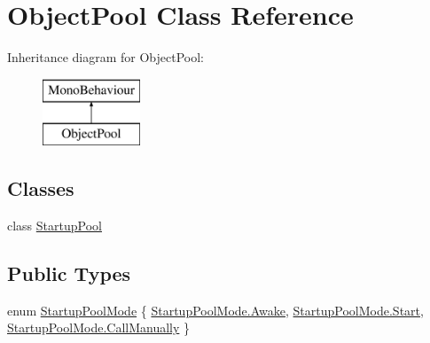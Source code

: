 \hypertarget{class_object_pool}{}\section{Object\+Pool Class Reference}
\label{class_object_pool}
Inheritance diagram for Object\+Pool\+:\begin{figure}[H]
\begin{center}
\leavevmode
\includegraphics[height=2.000000cm]{class_object_pool}
\end{center}
\end{figure}
\subsection*{Classes}
\begin{DoxyCompactItemize}
\item 
class \hyperlink{class_object_pool_1_1_startup_pool}{Startup\+Pool}
\end{DoxyCompactItemize}
\subsection*{Public Types}
\begin{DoxyCompactItemize}
\item 
enum \hyperlink{class_object_pool_ad94dc76a38c1ce6273fe9a25590e2e7a}{Startup\+Pool\+Mode} \{ \hyperlink{class_object_pool_ad94dc76a38c1ce6273fe9a25590e2e7aa9ca8bcac74fbf1f118cc3589aeca836f}{Startup\+Pool\+Mode.\+Awake}, 
\hyperlink{class_object_pool_ad94dc76a38c1ce6273fe9a25590e2e7aaa6122a65eaa676f700ae68d393054a37}{Startup\+Pool\+Mode.\+Start}, 
\hyperlink{class_object_pool_ad94dc76a38c1ce6273fe9a25590e2e7aad72789e168d08643de0b38c7f868303a}{Startup\+Pool\+Mode.\+Call\+Manually}
 \}
\end{DoxyCompactItemize}
